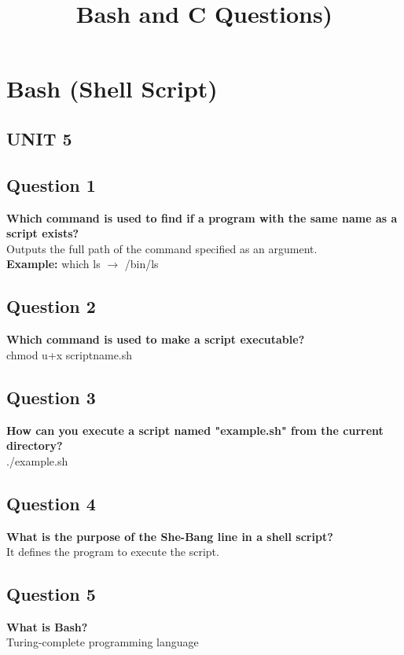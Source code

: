 \documentclass[11pt,parskip]{scrartcl}
\title{Bash and C Questions)}
\author{}
\date{}
\begin{document}
\maketitle

\section*{Bash (Shell Script)}

\subsection*{UNIT 5}

\subsection*{Question 1}
\textbf{Which command is used to find if a program with the same name as a script exists?} \\
    Outputs the full path of the command specified as an argument. \\
   \textbf{Example:} which ls $\rightarrow$ /bin/ls
   
\subsection*{Question 2}
\textbf{Which command is used to make a script executable?} \\
chmod u+x scriptname.sh

\subsection*{Question 3}
\textbf{How can you execute a script named "example.sh" from the current directory?} \\
./example.sh

\subsection*{Question 4}
\textbf{What is the purpose of the She-Bang line in a shell script?} \\
It defines the program to execute the script.

\subsection*{Question 5}
\textbf{What is Bash?} \\
Turing-complete programming language
\end{document}
